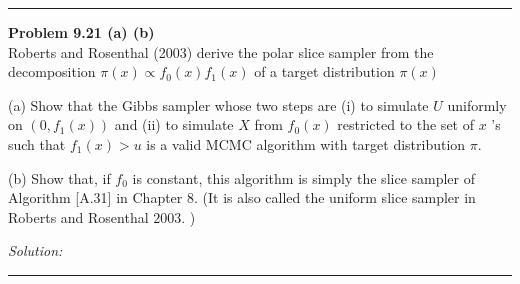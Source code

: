 \documentclass[a4paper, 11pt]{article}
\newenvironment{problem}[2][Problem]
    { \begin{mdframed}[backgroundcolor=gray!20] \textbf{#1 #2} \\}
    {  \end{mdframed}}
\newenvironment{solution}
    {\textit{Solution:}}
    {}
\begin{document}
\noindent\rule{7in}{2.8pt}

\begin{problem}{9.21 (a) (b)}
	 Roberts and Rosenthal (2003) derive the polar slice sampler from the decomposition $\pi(x) \propto f_{0}(x) f_{1}(x)$ of a target distribution $\pi(x)$
	 
	(a) Show that the Gibbs sampler whose two steps are
	(i) to simulate $U$ uniformly on $(0, f_{1}(x))$ and
	(ii) to simulate $X$ from $f_{0}(x)$ restricted to the set of $x$ 's such that $f_{1}(x)>u$ is a valid MCMC algorithm with target distribution $\pi$.
	
	(b) Show that, if $f_{0}$ is constant, this algorithm is simply the slice sampler of Algorithm [A.31] in Chapter 8. (It is also called the uniform slice sampler in Roberts and Rosenthal $2003 .$ )
\end{problem}
\begin{solution}
	
	
\end{solution}

\noindent\rule{7in}{2.8pt}
\end{document}
